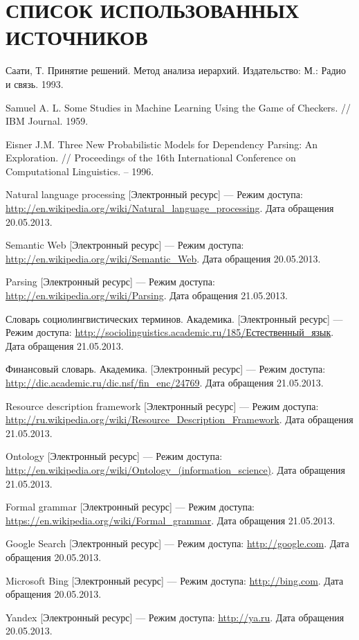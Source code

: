 \renewcommand*{\refname}{}
\section*{\centering СПИСОК ИСПОЛЬЗОВАННЫХ ИСТОЧНИКОВ}
\begin{thebibliography}{99}	
	Саати, Т. Принятие решений. Метод анализа иерархий. Издательство: М.: Радио и связь. 1993.	

	Samuel A. L. Some Studies in Machine Learning Using the Game of Checkers. // IBM Journal. 1959.

	Eisner J.M. Three New Probabilistic Models for Dependency Parsing: An Exploration. // Proceedings of the 16th International Conference on Computational Linguistics. – 1996.

	Natural language processing [Электронный ресурс] --- Режим доступа: \url{http://en.wikipedia.org/wiki/Natural_language_processing}. Дата обращения 20.05.2013.

	Semantic Web [Электронный ресурс] --- Режим доступа: \url{http://en.wikipedia.org/wiki/Semantic_Web}. Дата обращения 20.05.2013.

	Parsing [Электронный ресурс] --- Режим доступа: \url{http://en.wikipedia.org/wiki/Parsing}. Дата обращения 21.05.2013.

	Словарь социолингвистических терминов. Академика. [Электронный ресурс] --- Режим доступа: \url{http://sociolinguistics.academic.ru/185/Естественный_язык}. Дата обращения 21.05.2013.

	Финансовый словарь. Академика. [Электронный ресурс] --- Режим доступа: \url{http://dic.academic.ru/dic.nsf/fin_enc/24769}. Дата обращения 21.05.2013.

	Resource description framework [Электронный ресурс] --- Режим доступа: \url{http://ru.wikipedia.org/wiki/Resource_Description_Framework}. Дата обращения 21.05.2013.

	Ontology [Электронный ресурс] --- Режим доступа: \url{http://en.wikipedia.org/wiki/Ontology_(information_science)}. Дата обращения 21.05.2013. 

	Formal grammar [Электронный ресурс] --- Режим доступа: \url{https://en.wikipedia.org/wiki/Formal_grammar}. Дата обращения 21.05.2013.

	Google Search [Электронный ресурс] --- Режим доступа: \url{http://google.com}. Дата обращения 20.05.2013.

	Microsoft Bing [Электронный ресурс] --- Режим доступа: \url{http://bing.com}. Дата обращения 20.05.2013.

	Yandex [Электронный ресурс] --- Режим доступа: \url{http://ya.ru}. Дата обращения 20.05.2013.
\end{thebibliography}